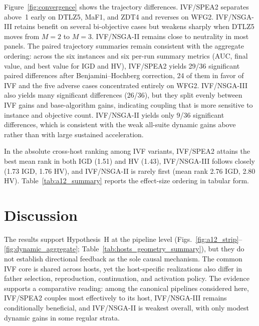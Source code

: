 \documentclass[runningheads]{llncs}
\begin{document}
Figure~\ref{fig:convergence} shows the trajectory differences. IVF/SPEA2 separates above~1 early on DTLZ5, MaF1, and ZDT4 and reverses on WFG2. IVF/NSGA-III retains benefit on several bi-objective cases but weakens sharply when DTLZ5 moves from $M=2$ to $M=3$. IVF/NSGA-II remains close to neutrality in most panels. The paired trajectory summaries remain consistent with the aggregate ordering: across the six instances and six per-run summary metrics (AUC, final value, and best value for IGD and HV), IVF/SPEA2 yields 29/36 significant paired differences after Benjamini--Hochberg correction, 24 of them in favor of IVF and the five adverse cases concentrated entirely on WFG2. IVF/NSGA-III also yields many significant differences (26/36), but they split evenly between IVF gains and base-algorithm gains, indicating coupling that is more sensitive to instance and objective count. IVF/NSGA-II yields only 9/36 significant differences, which is consistent with the weak all-suite dynamic gains above rather than with large sustained acceleration.

In the absolute cross-host ranking among IVF variants, IVF/SPEA2 attains the best mean rank in both IGD (1.51) and HV (1.43), IVF/NSGA-III follows closely (1.73 IGD, 1.76 HV), and IVF/NSGA-II is rarely first (mean rank 2.76 IGD, 2.80 HV). Table~\ref{tab:a12_summary} reports the effect-size ordering in tabular form.



\FloatBarrier
\section{Discussion}
\label{sec:discussion}

The results support Hypothesis~H at the pipeline level (Figs.~\ref{fig:a12_strip}--\ref{fig:dynamic_aggregate}; Table~\ref{tab:hosts_geometry_summary}), but they do not establish directional feedback as the sole causal mechanism. The common IVF core is shared across hosts, yet the host-specific realizations also differ in father selection, reproduction, continuation, and activation policy. The evidence supports a comparative reading: among the canonical pipelines considered here, IVF/SPEA2 couples most effectively to its host, IVF/NSGA-III remains conditionally beneficial, and IVF/NSGA-II is weakest overall, with only modest dynamic gains in some regular strata.
\end{document}
